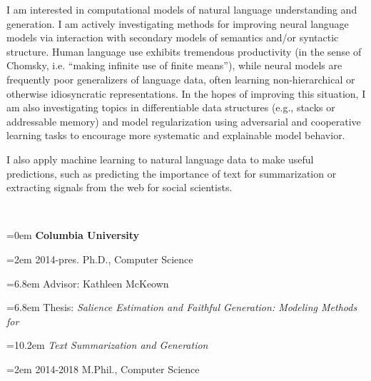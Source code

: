 \documentclass{scrartcl}
\newcommand{\MarginSection}[1]{\marginpar{#1}}
\begin{document}
\begin{cv}{}
\MarginSection{~\\Research\\Statement} 
I am interested in computational models of natural language understanding 
and generation. I am actively investigating methods for 
improving neural language models via interaction with secondary 
models of semantics
and/or syntactic structure. Human language use exhibits tremendous 
productivity (in the sense of Chomsky, i.e. ``making infinite use of finite means''), while neural models are frequently poor generalizers of language 
data, often learning non-hierarchical or otherwise 
idiosyncratic representations. 
In the hopes of improving this situation, 
I am also investigating topics in differentiable data structures 
(e.g., stacks or addressable memory) and 
model regularization using adversarial and cooperative learning tasks
to encourage more systematic and explainable model behavior.

I also apply machine learning to natural language data
to make useful predictions, such as predicting the importance 
of text for summarization or extracting signals
from the web for social scientists.





 




 ~\\


{\noindent\hangindent=0em \MarginSection{Education}\textbf{Columbia University}

 \noindent\hangindent=2em 2014-pres. Ph.D., Computer Science 

\noindent\hangindent=6.8em Advisor: Kathleen McKeown

\noindent\hangindent=6.8em Thesis: \textit{Salience Estimation and Faithful Generation: Modeling Methods for}

\noindent\hangindent=10.2em \textit{Text Summarization and Generation}


\noindent\hangindent=2em 2014-2018 M.Phil., Computer Science 

}
\end{cv}
\end{document}
